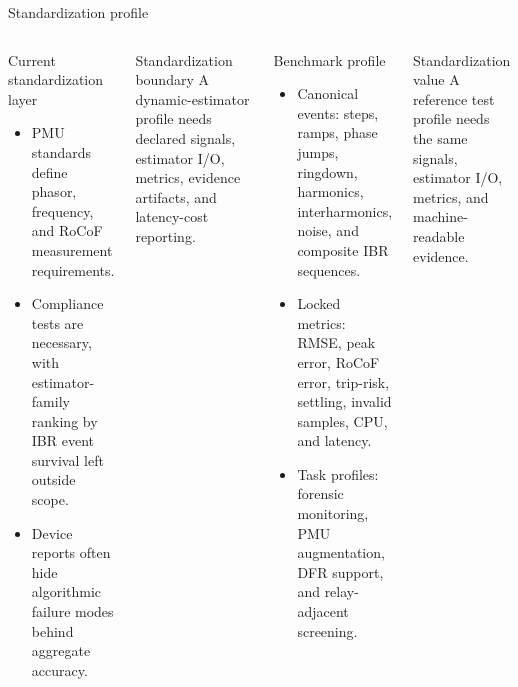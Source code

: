 \documentclass[aspectratio=169,10pt]{beamer}
\begin{document}
\begin{frame}{Standardization profile}
\begin{columns}[T,onlytextwidth]
\begin{block}{Current standardization layer}
\scriptsize
\begin{itemize}
  \item PMU standards define phasor, frequency, and RoCoF measurement requirements.
  \item Compliance tests are necessary, with estimator-family ranking by IBR event survival left outside scope.
  \item Device reports often hide algorithmic failure modes behind aggregate accuracy.
\end{itemize}
\end{block}
\begin{block}{Standardization boundary}
\scriptsize
A dynamic-estimator profile needs declared signals, estimator I/O, metrics, evidence artifacts, and latency-cost reporting.
\end{block}
\begin{block}{Benchmark profile}
\scriptsize
\begin{itemize}
  \item Canonical events: steps, ramps, phase jumps, ringdown, harmonics, interharmonics, noise, and composite IBR sequences.
  \item Locked metrics: RMSE, peak error, RoCoF error, trip-risk, settling, invalid samples, CPU, and latency.
  \item Task profiles: forensic monitoring, PMU augmentation, DFR support, and relay-adjacent screening.
\end{itemize}
\end{block}
\begin{block}{Standardization value}
\scriptsize
A reference test profile needs the same signals, estimator I/O, metrics, and machine-readable evidence.
\end{block}
\end{columns}
\end{frame}
\end{document}
